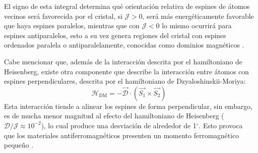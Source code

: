 \documentclass[../main.tex]{subfiles}
\begin{document}
El signo de esta integral determina qué orientación relativa de espines de átomos vecinos será favorecida por el cristal, si $\mathcal{J}>0$, será más energéticamente favorable que haya espines paralelos, mientras que con $\mathcal{J}<0$ lo mismo ocurrirá para espines antiparalelos, esto a su vez genera regiones del cristal con espines ordenados paralela o antiparalelamente, conocidas como dominios magnéticos \cite{coey2010magnetism}.

Cabe mencionar que, además de la interacción descrita por el hamiltoniano de Heisenberg, existe otra componente que describe la interacción entre átomos con espines perpendiculares, descrita por el hamiltoniano de Dzyaloshinskii-Moriya:
\begin{equation}
    \mathcal{H}_\text{DM}=-\vec{\mathcal{D}}\cdot\left(\vec{S_1}\times\vec{S_2}\right)
    \label{eq:hamiltonianoDM}
\end{equation}
Esta interacción tiende a alinear los espines de forma perpendicular, sin embargo, es de mucha menor magnitud al efecto del hamiltoniano de Heisenberg ($\mathcal{D}/\mathcal{J}\approx10^{-2}$), lo cual produce una desviación de alrededor de 1$^\circ$. Esto provoca que los materiales antiferromagnéticos presenten un momento ferromagnético pequeño \cite{coey2010magnetism}.
\end{document}
